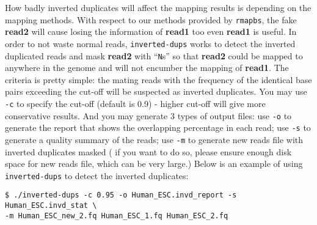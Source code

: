 \documentclass[10pt]{article}
\newcommand{\prog}[1]{\texttt{#1}}
\newcommand{\op}[1]{\texttt{#1}}
\newcommand{\DNA}[1]{\texttt{\uppercase{#1}}}
\begin{document}
How badly inverted duplicates will affect the mapping results is depending on the mapping methods. With respect to our methods provided by \prog{rmapbs}, the fake \textbf{read2} will cause losing the information of \textbf{read1} too even \textbf{read1} is useful. In order to not waste normal reads, \prog{inverted-dups} works to detect the inverted duplicated reads and mask \textbf{read2} with ``\DNA{N}s'' so that \textbf{read2} could be mapped to anywhere in the genome and will not encumber the mapping of \textbf{read1}. The criteria is pretty simple: the mating reads with the frequency of the identical base pairs exceeding the cut-off will be suspected as inverted duplicates. You may use \op{-c} to specify the cut-off (default is 0.9) - higher cut-off will give more conservative results. And you may generate 3 types of output files: use \op{-o} to generate the report that shows the overlapping percentage in each read; use \op{-s} to generate a quality summary of the reads; use \op{-m} to generate new reads file with inverted duplicates masked ( if you want to do so, please ensure enough disk space for new reads file, which can be very large.) 
Below is an example of using \prog{inverted-dups} to detect the inverted duplicates:
\begin{verbatim}
$ ./inverted-dups -c 0.95 -o Human_ESC.invd_report -s Human_ESC.invd_stat \
-m Human_ESC_new_2.fq Human_ESC_1.fq Human_ESC_2.fq
\end{verbatim}




\end{document}
